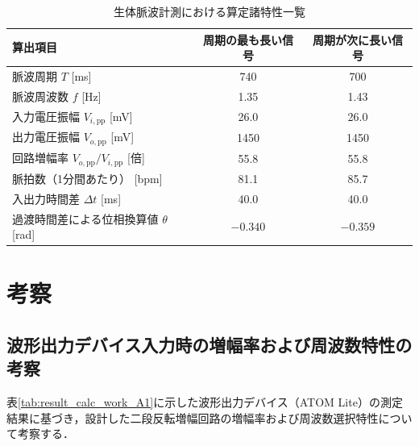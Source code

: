 \begin{table}[htbp]
  \caption{生体脈波計測における算定諸特性一覧}
  \centering
  \small
  \begin{tabular}{|l||c|c|}
    \hline
    算出項目                   & 周期の最も長い信号 & 周期が次に長い信号 \\
    \hline\hline
    脈波周期 $T$ [ms]          & 740       & 700       \\
    \hline
    脈波周波数 $f$ [Hz]        & 1.35      & 1.43      \\
    \hline
    入力電圧振幅 $V_{i,\mathrm{pp}}$ [mV]      & 26.0      & 26.0      \\
    \hline
    出力電圧振幅 $V_{o,\mathrm{pp}}$ [mV]      & 1450      & 1450      \\
    \hline
    回路増幅率 $V_{o,\mathrm{pp}}/V_{i,\mathrm{pp}}$ [倍]    & 55.8      & 55.8      \\
    \hline
    脈拍数（1分間あたり） [bpm]      & 81.1      & 85.7      \\
    \hline
    入出力時間差 $\Delta t$ [ms] & 40.0      & 40.0      \\
    \hline
    過渡時間差による位相換算値 $\theta$ [rad]   & $-0.340$  & $-0.359$  \\
    \hline
  \end{tabular}
  \label{tab:result_calc_work_A2}
\end{table}


\section{考察}

\subsection{波形出力デバイス入力時の増幅率および周波数特性の考察}

表\ref{tab:result_calc_work_A1}に示した波形出力デバイス（ATOM Lite）の測定結果に基づき，設計した二段反転増幅回路の増幅率および周波数選択特性について考察する．

